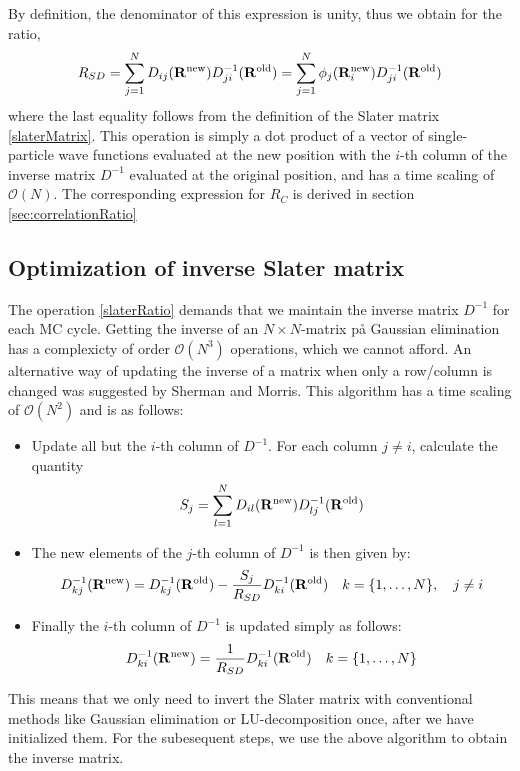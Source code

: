 \documentclass[english, a4paper]{article}
\begin{document}
By definition, the denominator of this expression is unity, thus we obtain for the ratio,
\begin{equation}
 R_{SD} = \sum_{j=1}^N D_{ij}({\bf R}^{\textrm{new}}) D_{ji}^{-1}({\bf R}^{\textrm{old}})
        = \sum_{j=1}^N \phi_j({\bf R}_i^{\textrm{new}}) D_{ji}^{-1}({\bf R}^{\textrm{old}})
        \label{slaterRatio}
\end{equation}
where the last equality follows from the definition of the Slater matrix \eqref{slaterMatrix}. 
This operation is simply a dot product of a vector of single-particle wave functions evaluated
at the new position with the $i$-th column of the inverse matrix $D^{-1}$ evaluated at the original position,
and has a time scaling of $\mathcal{O}(N)$. The corresponding expression for $R_C$ is
derived in section \ref{sec:correlationRatio}

\noindent 

\subsection{Optimization of inverse Slater matrix}
\noindent The operation \eqref{slaterRatio} demands that we maintain the inverse matrix $D^{-1}$ for each
MC cycle. Getting the inverse of an $N\times N$-matrix på Gaussian elimination has a complexicty of order
$\mathcal{O}(N^3)$ operations, which we cannot afford. An alternative way of updating the inverse
of a matrix when only a row/column is changed was suggested by Sherman and Morris. 
This algorithm has a time scaling
of $\mathcal{O}(N^2)$ and is as follows:
\begin{itemize}
 \item Update all but the $i$-th column of $D^{-1}$. For each column $j\neq i$,
 calculate the quantity 
 $$S_j = \sum_{l=1}^N D_{il} ({\bf R}^{\textrm{new}}) D_{lj}^{-1} ({\bf R}^{\textrm{old}})$$
 \item The new elements of the $j$-th column of $D^{-1}$ is then given by: 
 $$D_{kj}^{-1}({\bf R}^{\textrm{new}}) = D_{kj}^{-1}({\bf R}^{\textrm{old}}) - \frac{S_j}{R_{SD}}
 D_{ki}^{-1}({\bf R}^{\textrm{old}}) \quad k = \{1,\dots,N\}, \quad j \neq i$$
 \item Finally the $i$-th column of $D^{-1}$ is updated simply as follows:
 $$D_{ki}^{-1}({\bf R}^{\textrm{new}}) = \frac{1}{R_{SD}} D_{ki}^{-1}({\bf R}^{\textrm{old}}) \quad
 k = \{1,\dots,N\}$$
\end{itemize}
This means that we only need to invert the Slater matrix with conventional methods like
Gaussian elimination or LU-decomposition once, after we have initialized them. For the subesequent steps,
we use the above algorithm to obtain the inverse matrix. 
\end{document}
